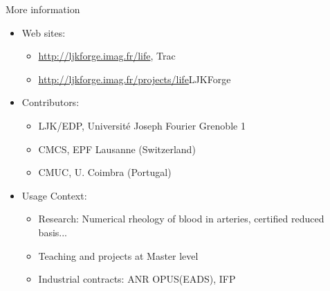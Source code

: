 \documentclass[final,utf8,,hyperref={pdfpagelabels=false}]{beamer}
\begin{document}
\begin{frame}[containsverbatim]{}
\begin{columns}[c]
  
    \begin{block}{More information}
      \begin{itemize}
      \item Web sites:
        \begin{itemize}
        \item \url{http://ljkforge.imag.fr/life}, \hfill{Trac}
        \item \url{http://ljkforge.imag.fr/projects/life}\hfill{LJKForge}
        \end{itemize}
      \item Contributors:
        \begin{itemize}
        \item LJK/EDP, Université Joseph Fourier Grenoble 1
        \item CMCS, EPF Lausanne (Switzerland)
        \item CMUC, U. Coimbra (Portugal)
        \end{itemize}
      \item Usage Context:
        \begin{itemize}
        \item Research: Numerical rheology of blood in arteries, certified
          reduced basis...
        \item Teaching and projects at Master level
        \item Industrial contracts: ANR OPUS(EADS), IFP
        \end{itemize}
      \end{itemize}

      

    \end{block}
  

\end{columns}
\end{frame}
\end{document}
